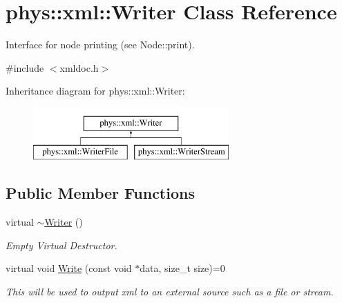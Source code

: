 \hypertarget{classphys_1_1xml_1_1Writer}{
\section{phys::xml::Writer Class Reference}
\label{d2/d28/classphys_1_1xml_1_1Writer}
}


Interface for node printing (see Node::print).  




{\ttfamily \#include $<$xmldoc.h$>$}

Inheritance diagram for phys::xml::Writer:\begin{figure}[H]
\begin{center}
\leavevmode
\includegraphics[height=2.000000cm]{d2/d28/classphys_1_1xml_1_1Writer}
\end{center}
\end{figure}
\subsection*{Public Member Functions}
\begin{DoxyCompactItemize}
\item 
\hypertarget{classphys_1_1xml_1_1Writer_a527c2e01738b1e570d08674eada21800}{
virtual \hyperlink{classphys_1_1xml_1_1Writer_a527c2e01738b1e570d08674eada21800}{$\sim$Writer} ()}
\label{d2/d28/classphys_1_1xml_1_1Writer_a527c2e01738b1e570d08674eada21800}

\begin{DoxyCompactList}\small\item\em Empty Virtual Destructor. \item\end{DoxyCompactList}\item 
virtual void \hyperlink{classphys_1_1xml_1_1Writer_ab6d4758ab53743f236eb64d5b2dd7e9e}{Write} (const void $\ast$data, size\_\-t size)=0
\begin{DoxyCompactList}\small\item\em This will be used to output xml to an external source such as a file or stream. \item\end{DoxyCompactList}\end{DoxyCompactItemize}


